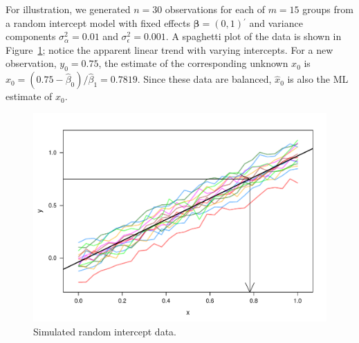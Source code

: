 \documentclass[cmfont,usenames,dvipsnames,leqno]{afit-etd}\usepackage[]{graphicx}\usepackage[]{color}
\makeatletter
\def\maxwidth{ %
  \ifdim\Gin@nat@width>\linewidth
    \linewidth
  \else
    \Gin@nat@width
  \fi
}
\newenvironment{knitrout}{}{} %
\renewenvironment{knitrout}{\begin{singlespace}}{\end{singlespace}}
\newcommand{\trans}{\ensuremath{^\prime}}
\newcommand{\wh}[1]{\ensuremath{\widehat{#1}}}
\makeatother
\begin{document}
For illustration, we generated $n = 30$ observations for each of $m = 15$ groups from a random intercept model with fixed effects $\bm{\beta} = \left(0, 1\right)\trans$ and variance components $\sigma_\alpha^2 = 0.01$ and $\sigma_\epsilon^2 = 0.001$. A spaghetti plot of the data is shown in Figure~\ref{fig:simdata-scatter}; notice the apparent linear trend with varying intercepts. For a new observation, $y_0 = 0.75$, the estimate of the corresponding unknown $x_0$ is $\wh{x}_0 = \left(0.75 - \wh{\beta}_0\right)/\wh{\beta}_1 = 0.7819$. Since these data are balanced, $\wh{x}_0$ is also the \ac{ML} estimate of $x_0$. 

\begin{knitrout}
\color{fgcolor}\begin{figure}[H]

\includegraphics[width=\maxwidth]{figure/simdata-scatter} \caption[Scatterplot of simulated random intercept data]{Simulated random intercept data.\label{fig:simdata-scatter}}
\end{figure}


\end{knitrout}
\end{document}
